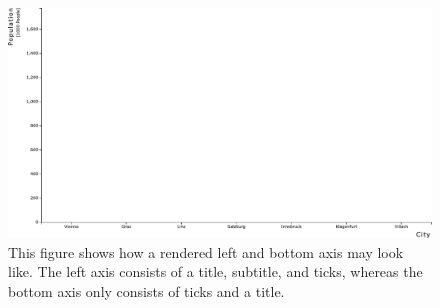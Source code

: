 \begin{figure}[tp]
\centering
\includegraphics[keepaspectratio,width=\linewidth,height=\fullh]{diagrams/axes.pdf}
\caption[RespVis Axis Components]{
  This figure shows how a rendered left and bottom axis may look like.
  The left axis consists of a title, subtitle, and ticks, whereas the bottom axis only consists of ticks and a title. 
}
\label{fig:Axes}
\end{figure}
  

